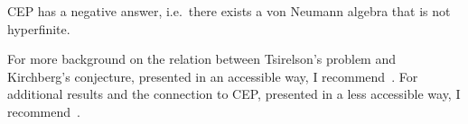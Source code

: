 \begin{corollary}
CEP has a negative answer, i.e.\ there exists a von Neumann algebra that is not hyperfinite. 
\end{corollary}

For more background on the relation between Tsirelson's problem and Kirchberg's conjecture, presented in an accessible way, I recommend~\cite{fritz2012tsirelson}. For additional results and the connection to CEP, presented in a less accessible way, I recommend~\cite{ozawa2013connes}. 
